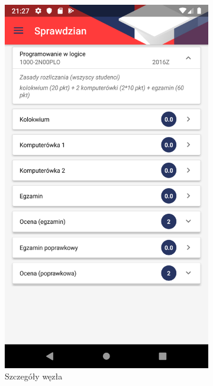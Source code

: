 \documentclass{pracamgr}
\begin{document}
\begin{figure}[p]
\begin{subfigure}[t]{0.3\textwidth}
		\includegraphics[width=\textwidth]{img/tests_root_details.png}
		\caption{Szczegóły węzła}
		\label{fig:tests_root_details}
	\end{subfigure}
	\\
	\begin{subfigure}[t]{0.3\textwidth}

\end{subfigure}
\end{figure}
\end{document}
